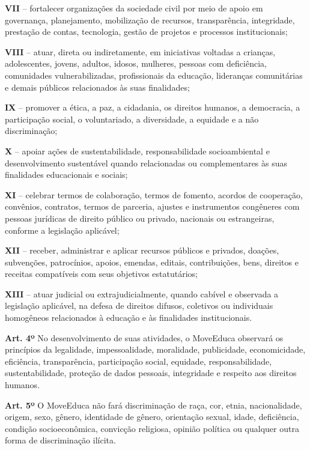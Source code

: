 \documentclass[11pt,a4paper]{article}
\begin{document}
\textbf{VII} -- fortalecer organizações da sociedade civil por meio de apoio em governança, planejamento, mobilização de recursos, transparência, integridade, prestação de contas, tecnologia, gestão de projetos e processos institucionais;

\textbf{VIII} -- atuar, direta ou indiretamente, em iniciativas voltadas a crianças, adolescentes, jovens, adultos, idosos, mulheres, pessoas com deficiência, comunidades vulnerabilizadas, profissionais da educação, lideranças comunitárias e demais públicos relacionados às suas finalidades;

\textbf{IX} -- promover a ética, a paz, a cidadania, os direitos humanos, a democracia, a participação social, o voluntariado, a diversidade, a equidade e a não discriminação;

\textbf{X} -- apoiar ações de sustentabilidade, responsabilidade socioambiental e desenvolvimento sustentável quando relacionadas ou complementares às suas finalidades educacionais e sociais;

\textbf{XI} -- celebrar termos de colaboração, termos de fomento, acordos de cooperação, convênios, contratos, termos de parceria, ajustes e instrumentos congêneres com pessoas jurídicas de direito público ou privado, nacionais ou estrangeiras, conforme a legislação aplicável;

\textbf{XII} -- receber, administrar e aplicar recursos públicos e privados, doações, subvenções, patrocínios, apoios, emendas, editais, contribuições, bens, direitos e receitas compatíveis com seus objetivos estatutários;

\textbf{XIII} -- atuar judicial ou extrajudicialmente, quando cabível e observada a legislação aplicável, na defesa de direitos difusos, coletivos ou individuais homogêneos relacionados à educação e às finalidades institucionais.

\textbf{Art. 4º} No desenvolvimento de suas atividades, o MoveEduca observará os princípios da legalidade, impessoalidade, moralidade, publicidade, economicidade, eficiência, transparência, participação social, equidade, responsabilidade, sustentabilidade, proteção de dados pessoais, integridade e respeito aos direitos humanos.

\textbf{Art. 5º} O MoveEduca não fará discriminação de raça, cor, etnia, nacionalidade, origem, sexo, gênero, identidade de gênero, orientação sexual, idade, deficiência, condição socioeconômica, convicção religiosa, opinião política ou qualquer outra forma de discriminação ilícita.
\end{document}
